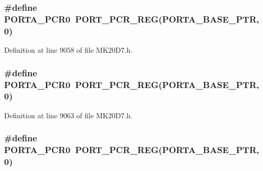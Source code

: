 \subsubsection[{\texorpdfstring{P\+O\+R\+T\+A\+\_\+\+P\+C\+R0}{PORTA_PCR0}}]{\setlength{\rightskip}{0pt plus 5cm}\#define P\+O\+R\+T\+A\+\_\+\+P\+C\+R0~{\bf P\+O\+R\+T\+\_\+\+P\+C\+R\+\_\+\+R\+EG}({\bf P\+O\+R\+T\+A\+\_\+\+B\+A\+S\+E\+\_\+\+P\+TR},0)}\hypertarget{group___p_o_r_t___register___accessor___macros_gaf09680dfe5ed3f1f4df46364406b5d65}{}\label{group___p_o_r_t___register___accessor___macros_gaf09680dfe5ed3f1f4df46364406b5d65}


Definition at line 9058 of file M\+K20\+D7.\+h.

\subsubsection[{\texorpdfstring{P\+O\+R\+T\+A\+\_\+\+P\+C\+R0}{PORTA_PCR0}}]{\setlength{\rightskip}{0pt plus 5cm}\#define P\+O\+R\+T\+A\+\_\+\+P\+C\+R0~{\bf P\+O\+R\+T\+\_\+\+P\+C\+R\+\_\+\+R\+EG}({\bf P\+O\+R\+T\+A\+\_\+\+B\+A\+S\+E\+\_\+\+P\+TR},0)}\hypertarget{group___p_o_r_t___register___accessor___macros_gaf09680dfe5ed3f1f4df46364406b5d65}{}\label{group___p_o_r_t___register___accessor___macros_gaf09680dfe5ed3f1f4df46364406b5d65}


Definition at line 9063 of file M\+K20\+D7.\+h.

\subsubsection[{\texorpdfstring{P\+O\+R\+T\+A\+\_\+\+P\+C\+R0}{PORTA_PCR0}}]{\setlength{\rightskip}{0pt plus 5cm}\#define P\+O\+R\+T\+A\+\_\+\+P\+C\+R0~{\bf P\+O\+R\+T\+\_\+\+P\+C\+R\+\_\+\+R\+EG}({\bf P\+O\+R\+T\+A\+\_\+\+B\+A\+S\+E\+\_\+\+P\+TR},0)}\hypertarget{group___p_o_r_t___register___accessor___macros_gaf09680dfe5ed3f1f4df46364406b5d65}{}\label{group___p_o_r_t___register___accessor___macros_gaf09680dfe5ed3f1f4df46364406b5d65}



